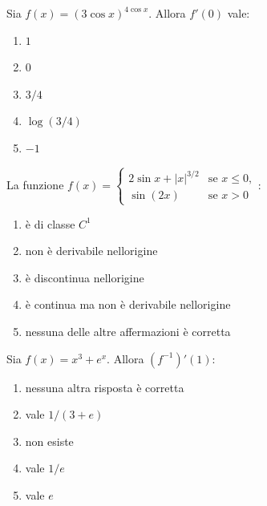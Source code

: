 \begin{quiz}
Sia $f(x)=(3\cos x)^{4\cos x}$. Allora $f\prime(0)$ vale:
\begin{enumerate}
\item $1$
\item $0$
\item $3/4$
\item $\log(3/4)$
\item $-1$
\end{enumerate}
\end{quiz}

\begin{quiz}
La funzione $\displaystyle f(x)=\begin{cases}2\sin x+|x|^{3/2}&\text{se }x\le0,\\\sin(2x)&\text{se }x>0\end{cases}$:
\begin{enumerate}
\item \`e di classe $C^1$
\item non \`e derivabile nell\textquotesingle origine
\item \`e discontinua nell\textquotesingle origine
\item \`e continua ma non \`e derivabile nell\textquotesingle origine
\item nessuna delle altre affermazioni \`e corretta
\end{enumerate}
\end{quiz}

\begin{quiz}
Sia $f(x)=x^3+e^x$. Allora $(f^{-1})\prime(1)$:
\begin{enumerate}
\item nessuna altra risposta \`e corretta
\item vale $1/(3+e)$
\item non esiste
\item vale $1/e$
\item vale $e$
\end{enumerate}
\end{quiz}

